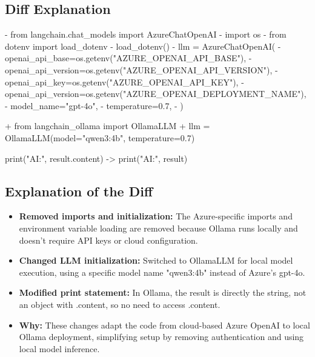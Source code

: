 \documentclass[11pt, a4paper]{article}
\begin{document}
\subsection{Diff Explanation}

\begin{removedcode}
\begin{diffverb}
- from langchain.chat_models import AzureChatOpenAI
- import os
- from dotenv import load_dotenv
- load_dotenv()
- llm = AzureChatOpenAI(
-     openai_api_base=os.getenv("AZURE_OPENAI_API_BASE"),
-     openai_api_version=os.getenv("AZURE_OPENAI_API_VERSION"),
-     openai_api_key=os.getenv("AZURE_OPENAI_API_KEY"),
-     openai_api_version=os.getenv("AZURE_OPENAI_DEPLOYMENT_NAME"),
-     model_name="gpt-4o",
-     temperature=0.7,
- )
\end{diffverb}
\end{removedcode}

\begin{addedcode}
\begin{diffverb}
+ from langchain_ollama import OllamaLLM
+ llm = OllamaLLM(model="qwen3:4b", temperature=0.7)
\end{diffverb}
\end{addedcode}

\begin{modifiedcode}
print("AI:", result.content) -> print("AI:", result)
\end{modifiedcode}

\subsection{Explanation of the Diff}
\begin{itemize}
    \item \textbf{Removed imports and initialization:} The Azure-specific imports and environment variable loading are removed because Ollama runs locally and doesn't require API keys or cloud configuration.
    \item \textbf{Changed LLM initialization:} Switched to OllamaLLM for local model execution, using a specific model name "qwen3:4b" instead of Azure's gpt-4o.
    \item \textbf{Modified print statement:} In Ollama, the result is directly the string, not an object with .content, so no need to access .content.
    \item \textbf{Why:} These changes adapt the code from cloud-based Azure OpenAI to local Ollama deployment, simplifying setup by removing authentication and using local model inference.
\end{itemize}
\end{document}
